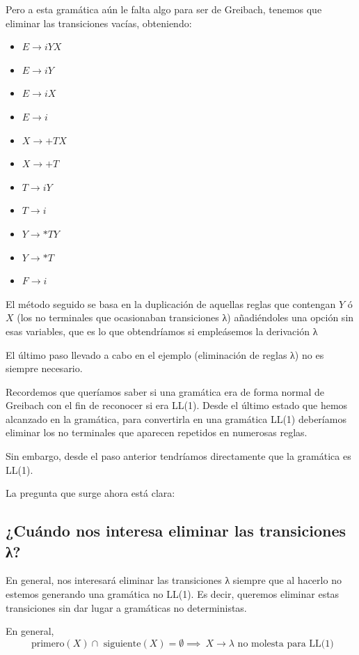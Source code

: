\documentclass{apuntes}
\begin{document}
\begin{example}
Pero a esta gramática aún le falta algo para ser de Greibach, tenemos que eliminar las transiciones vacías, obteniendo:
\begin{itemize}
\item $E \rightarrow iYX$
\item $E \rightarrow iY$
\item $E \rightarrow iX$
\item $E \rightarrow i$
\item $X \rightarrow +TX$
\item $X \rightarrow +T$
\item $T \rightarrow iY$
\item $T \rightarrow i$
\item $Y \rightarrow *TY$
\item $Y \rightarrow *T$
\item $F \rightarrow i$
\end{itemize}
El método seguido se basa en la duplicación de aquellas reglas que contengan $Y$ ó $X$ (los no terminales que ocasionaban transiciones λ) añadiéndoles una opción sin esas variables, que es lo que obtendríamos si empleásemos la derivación λ
\end{example}

El último paso llevado a cabo en el ejemplo (eliminación de reglas λ) no es siempre necesario.

Recordemos que queríamos saber si una gramática era de forma normal de Greibach con el fin de reconocer si era LL(1). Desde el último estado que hemos alcanzado en la gramática, para convertirla en una gramática LL(1) deberíamos eliminar los no terminales que aparecen repetidos en numerosas reglas.

Sin embargo, desde el paso anterior tendríamos directamente que la gramática es LL(1).

La pregunta que surge ahora está clara:

\subsection{¿Cuándo nos interesa eliminar las transiciones λ?}
En general, nos interesará eliminar las transiciones λ siempre que al hacerlo no estemos generando una gramática no LL(1). Es decir, queremos eliminar estas transiciones sin dar lugar a gramáticas no deterministas.

En general,
\[\text{ primero}(X) \cap \text{ siguiente}(X) = \emptyset \implies \ X \rightarrow λ\text{ no molesta para LL(1)}\]
\end{document}
